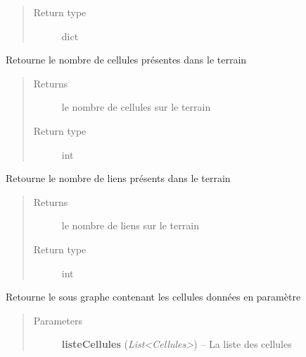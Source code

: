 \documentclass[letterpaper,10pt,english]{sphinxmanual}
\begin{document}
\begin{fulllineitems}
\begin{fulllineitems}
\begin{quote}
\begin{description}
\item[{Return type}] \leavevmode
dict

\end{description}\end{quote}

\end{fulllineitems}


\begin{fulllineitems}
\label{index:Terrain.Terrain.getNbCellules}
Retourne le nombre de cellules présentes dans le terrain
\begin{quote}\begin{description}
\item[{Returns}] \leavevmode
le nombre de cellules sur le terrain

\item[{Return type}] \leavevmode
int

\end{description}\end{quote}

\end{fulllineitems}


\begin{fulllineitems}
\label{index:Terrain.Terrain.getNbLiens}
Retourne le nombre de liens présents dans le terrain
\begin{quote}\begin{description}
\item[{Returns}] \leavevmode
le nombre de liens sur le terrain

\item[{Return type}] \leavevmode
int

\end{description}\end{quote}

\end{fulllineitems}


\begin{fulllineitems}
\label{index:Terrain.Terrain.getSousGraphe}
Retourne le sous graphe contenant les cellules données en paramètre
\begin{quote}\begin{description}
\item[{Parameters}] \leavevmode
\textbf{listeCellules} (\emph{List\textless{}Cellules\textgreater{}}) -- La liste des cellules


\end{description}
\end{quote}
\end{fulllineitems}
\end{fulllineitems}
\end{document}
